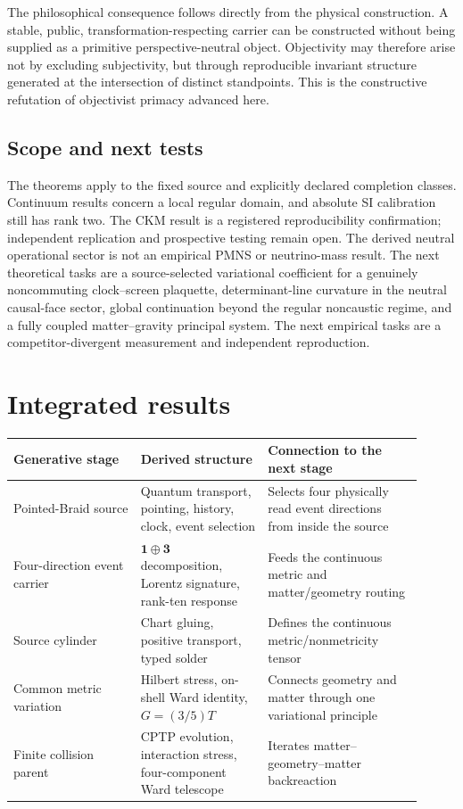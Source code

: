 \documentclass[11pt]{article}
\theoremstyle{definition}
\theoremstyle{remark}
\begin{document}
The philosophical consequence follows directly from the physical construction. A stable, public, transformation-respecting carrier can be constructed without being supplied as a primitive perspective-neutral object. Objectivity may therefore arise not by excluding subjectivity, but through reproducible invariant structure generated at the intersection of distinct standpoints. This is the constructive refutation of objectivist primacy advanced here.

\subsection{Scope and next tests}

The theorems apply to the fixed source and explicitly declared completion classes. Continuum results concern a local regular domain, and absolute SI calibration still has rank two. The CKM result is a registered reproducibility confirmation; independent replication and prospective testing remain open. The derived neutral operational sector is not an empirical PMNS or neutrino-mass result. The next theoretical tasks are a source-selected variational coefficient for a genuinely noncommuting clock--screen plaquette, determinant-line curvature in the neutral causal-face sector, global continuation beyond the regular noncaustic regime, and a fully coupled matter--gravity principal system. The next empirical tasks are a competitor-divergent measurement and independent reproduction.

\section{Integrated results}

\begin{tabularx}{\linewidth}{>{\raggedright\arraybackslash}p{0.28\linewidth} >{\raggedright\arraybackslash}p{0.29\linewidth} >{\raggedright\arraybackslash}p{0.34\linewidth}}
\toprule
Generative stage & Derived structure & Connection to the next stage \\
\midrule
Pointed-Braid source & Quantum transport, pointing, history, clock, event selection & Selects four physically read event directions from inside the source \\
Four-direction event carrier & $\mathbf1\oplus\mathbf3$ decomposition, Lorentz signature, rank-ten response & Feeds the continuous metric and matter/geometry routing \\
Source cylinder & Chart gluing, positive transport, typed solder & Defines the continuous metric/nonmetricity tensor \\
Common metric variation & Hilbert stress, on-shell Ward identity, $G=(3/5)T$ & Connects geometry and matter through one variational principle \\
Finite collision parent & CPTP evolution, interaction stress, four-component Ward telescope & Iterates matter--geometry--matter backreaction \\
\bottomrule
\end{tabularx}
\end{document}
